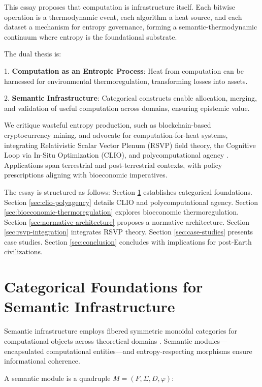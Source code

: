 \documentclass[12pt]{article}
\begin{document}
This essay proposes that computation is infrastructure itself. Each bitwise operation is a thermodynamic event, each algorithm a heat source, and each dataset a mechanism for entropy governance, forming a semantic-thermodynamic continuum where entropy is the foundational substrate.

The dual thesis is:

1. \textbf{Computation as an Entropic Process}: Heat from computation can be harnessed for environmental thermoregulation, transforming losses into assets.

2. \textbf{Semantic Infrastructure}: Categorical constructs enable allocation, merging, and validation of useful computation across domains, ensuring epistemic value.

We critique wasteful entropy production, such as blockchain-based cryptocurrency mining, and advocate for computation-for-heat systems, integrating Relativistic Scalar Vector Plenum (RSVP) field theory, the Cognitive Loop via In-Situ Optimization (CLIO), and polycomputational agency \citep{ChengBroadbentChappell2025, Shulman2012, AbramskyCoecke2004}. Applications span terrestrial and post-terrestrial contexts, with policy prescriptions aligning with bioeconomic imperatives.

The essay is structured as follows: Section \ref{sec:categorical-foundations} establishes categorical foundations. Section \ref{sec:clio-polyagency} details CLIO and polycomputational agency. Section \ref{sec:bioeconomic-thermoregulation} explores bioeconomic thermoregulation. Section \ref{sec:normative-architecture} proposes a normative architecture. Section \ref{sec:rsvp-integration} integrates RSVP theory. Section \ref{sec:case-studies} presents case studies. Section \ref{sec:conclusion} concludes with implications for post-Earth civilizations.

\section{Categorical Foundations for Semantic Infrastructure}
\label{sec:categorical-foundations}

Semantic infrastructure employs fibered symmetric monoidal categories for computational objects across theoretical domains \citep{BaezStay2010, MacLane1998}. Semantic modules---encapsulated computational entities---and entropy-respecting morphisms ensure informational coherence.

A semantic module is a quadruple $ M = (F, \Sigma, D, \varphi) $:
\end{document}
